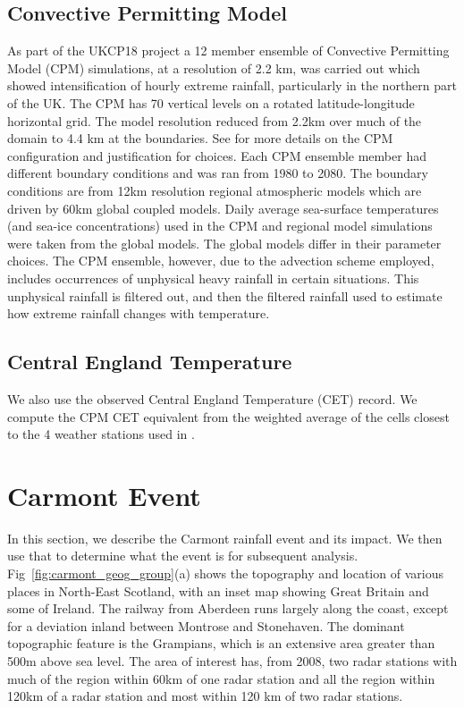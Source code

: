 \documentclass[11pt,a4paper]{article}
\begin{document}
\subsection{Convective Permitting Model}
 As part of the UKCP18 project a 12 member ensemble of Convective Permitting Model (CPM) simulations, at a resolution of 2.2 km, was carried out\parencite{kendon2023uk_cpm} which showed intensification of hourly extreme rainfall, particularly in the northern part of the UK. The CPM has 70 vertical levels on a rotated latitude-longitude horizontal grid. The model resolution reduced from 2.2km over much of the domain to 4.4 km at the boundaries. See \cite{art:fosser20} for more details on the CPM configuration and justification for choices. Each CPM ensemble member had different boundary conditions and was ran from 1980 to 2080.  The boundary conditions  are from 12km resolution regional atmospheric models which are driven by  60km global coupled models. Daily average sea-surface temperatures (and sea-ice concentrations) used in the CPM and regional model simulations were taken from the global models. The global models differ in their parameter choices. The CPM ensemble, however, due to the advection scheme employed, includes occurrences of unphysical heavy rainfall in certain situations.  This unphysical rainfall is filtered out, and then the filtered rainfall used to estimate how extreme rainfall changes with temperature. 

\subsection{Central England Temperature}
We also use the observed Central England Temperature (CET) record\parencite{parker92cet}. We compute the CPM CET equivalent from the weighted average of the cells closest to the 4 weather stations used in \cite{parker92cet}.  

\section{Carmont Event}

In this section, we describe the Carmont rainfall event and its impact. We then use that to determine what the event is for subsequent analysis. Fig~\ref{fig:carmont_geog_group}(a) shows the topography and location of various places in North-East Scotland, with an inset map showing Great Britain and some of Ireland. The railway from Aberdeen runs largely along the coast, except for a deviation inland between Montrose and Stonehaven.  The dominant topographic feature is the Grampians,  which is an extensive area greater than 500m above sea level. The area of interest has, from 2008, two radar stations with much of the region within 60km of one radar station and  all the region within 120km of a radar station and most within 120 km of two radar stations. 
\end{document}
